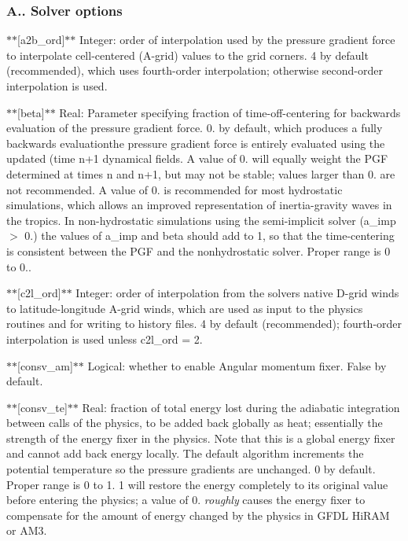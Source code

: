 \subsubsection*{A.. Solver options}

$\ast$$\ast$\mbox{[}a2b\-\_\-ord\mbox{]}$\ast$$\ast$ Integer\-: order of interpolation used by the pressure gradient force to interpolate cell-\/centered (A-\/grid) values to the grid corners. 4 by default (recommended), which uses fourth-\/order interpolation; otherwise second-\/order interpolation is used.

$\ast$$\ast$\mbox{[}beta\mbox{]}$\ast$$\ast$ Real\-: Parameter specifying fraction of time-\/off-\/centering for backwards evaluation of the pressure gradient force. 0. by default, which produces a fully backwards evaluationthe pressure gradient force is entirely evaluated using the updated (time {\ttfamily n+1} dynamical fields. A value of 0. will equally weight the P\-G\-F determined at times {\ttfamily n} and {\ttfamily n+1}, but may not be stable; values larger than 0. are not recommended. A value of 0. is recommended for most hydrostatic simulations, which allows an improved representation of inertia-\/gravity waves in the tropics. In non-\/hydrostatic simulations using the semi-\/implicit solver (a\-\_\-imp $>$ 0.) the values of a\-\_\-imp and beta should add to 1, so that the time-\/centering is consistent between the P\-G\-F and the nonhydrostatic solver. Proper range is 0 to 0..

$\ast$$\ast$\mbox{[}c2l\-\_\-ord\mbox{]}$\ast$$\ast$ Integer\-: order of interpolation from the solvers native D-\/grid winds to latitude-\/longitude A-\/grid winds, which are used as input to the physics routines and for writing to history files. 4 by default (recommended); fourth-\/order interpolation is used unless c2l\-\_\-ord = 2.

$\ast$$\ast$\mbox{[}consv\-\_\-am\mbox{]}$\ast$$\ast$ Logical\-: whether to enable Angular momentum fixer. False by default.

$\ast$$\ast$\mbox{[}consv\-\_\-te\mbox{]}$\ast$$\ast$ Real\-: fraction of total energy lost during the adiabatic integration between calls of the physics, to be added back globally as heat; essentially the strength of the energy fixer in the physics. Note that this is a global energy fixer and cannot add back energy locally. The default algorithm increments the potential temperature so the pressure gradients are unchanged. 0 by default. Proper range is 0 to 1. 1 will restore the energy completely to its original value before entering the physics; a value of 0. {\itshape roughly} causes the energy fixer to compensate for the amount of energy changed by the physics in G\-F\-D\-L Hi\-R\-A\-M or A\-M3.

